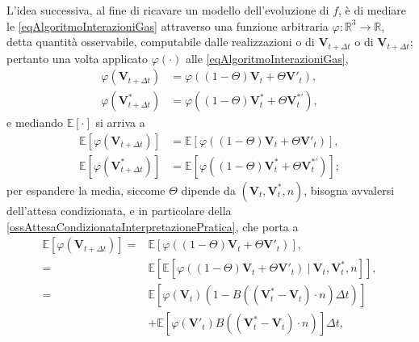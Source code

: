                 L'idea successiva, al fine di ricavare un modello dell'evoluzione di \(f\), è di mediare le \ref{eqAlgoritmoInterazioniGas} attraverso una funzione arbitraria \(\varphi\colon\mathbb R^3\to\mathbb R\), detta quantità osservabile, computabile dalle realizzazioni o di \(\mathbf V_{t+\Delta t}\) o di \(\mathbf V_{t+\Delta t}\); pertanto una volta applicato \(\varphi(\cdot)\) alle \ref{eqAlgoritmoInterazioniGas},
                \begin{equation*}
                    \begin{aligned}
                        \varphi(\mathbf V_{t+\Delta t})&=\varphi((1-\Theta)\mathbf V_t+\Theta\mathbf V'_t),\\
                        \varphi(\mathbf V^*_{t+\Delta t})&=\varphi((1-\Theta)\mathbf V^*_t+\Theta\mathbf V^{*\prime}_t),
                    \end{aligned}
                \end{equation*}
                e mediando \(\mathbb E[\cdot]\) si arriva a
                \begin{equation*}
                    \begin{aligned}
                        \mathbb E[\varphi(\mathbf V_{t+\Delta t})]&=\mathbb E[\varphi((1-\Theta)\mathbf V_t+\Theta\mathbf V'_t)],\\
                        \mathbb E[\varphi(\mathbf V^*_{t+\Delta t})]&=\mathbb E[\varphi((1-\Theta)\mathbf V^*_t+\Theta\mathbf V^{*\prime}_t)];
                    \end{aligned}
                \end{equation*}
                per espandere la media, siccome \(\Theta\) dipende da \((\mathbf V_t,\mathbf V^*_t,n)\), bisogna avvalersi dell'attesa condizionata, e in particolare della \cref{ossAttesaCondizionataInterpretazionePratica}, che porta a
                \begin{equation}
                    \label{eqMediaCondizionataGas}
                    \begin{aligned}
                        \mathbb E[\varphi(\mathbf V_{t+\Delta t})]
                        =&\mathbb E[\varphi((1-\Theta)\mathbf V_t+\Theta\mathbf V'_t)],
                        \\=&\mathbb E[\mathbb E[\varphi((1-\Theta)\mathbf V_t+\Theta\mathbf V'_t)\ |\ \mathbf V_t,\mathbf V_t^*,n]],
                        \\=&\mathbb E[\varphi(\mathbf V_t)(1-B((\mathbf V^*_t-\mathbf V_t)\cdot n)\Delta t)]
                        \\&+\mathbb E[\varphi(\mathbf V'_t)B((\mathbf V^*_t-\mathbf V_t)\cdot n)]\Delta t,
                    \end{aligned}
                \end{equation}
